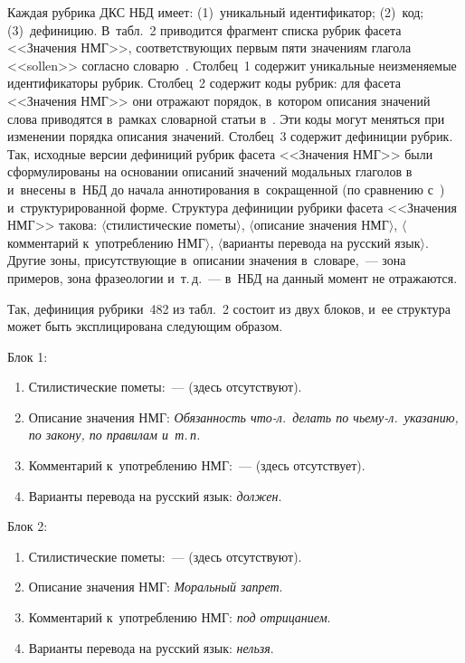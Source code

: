 \begin{multicols}{2}
 
     Каждая рубрика ДКС НБД имеет: (1)~уникальный идентификатор; (2)~код; 
(3)~дефиницию. В~табл.~2 приводится фрагмент списка рубрик фасета 
<<Значения НМГ>>, соответствующих первым пяти значениям глагола 
<<sollen>> согласно словарю~\cite{13-gon}. Столбец~1 содержит уникальные 
неизменяемые идентификаторы рубрик. Столбец~2 содержит коды рубрик: для 
фасета <<Значения НМГ>> они отражают порядок, в~котором описания 
значений слова приводятся в~рамках словарной статьи в~\cite{13-gon}. Эти 
коды могут меняться при изменении порядка описания значений. Столбец~3 
содержит дефиниции рубрик. Так, исходные версии дефиниций рубрик фасета 
<<Значения НМГ>> были сформулированы на основании описаний значений 
модальных глаголов в~\cite{13-gon} и~внесены в~НБД до начала 
аннотирования в~сокращенной (по сравнению  
с~\cite{13-gon}) и~структурированной форме. Структура дефиниции рубрики 
фасета <<Значения НМГ>> такова: $\langle$стилистические пометы$\rangle$, $\langle$описание 
значения НМГ$\rangle$, $\langle$комментарий к~употреблению НМГ$\rangle$, $\langle$варианты перевода 
на русский язык$\rangle$. Другие зоны, присутствующие в~описании значения 
в~словаре,~--- зона примеров, зона фразеологии и~т.\,д.~--- в~НБД на данный 
момент не отражаются.
     

     
     Так, дефиниция рубрики~482 из табл.~2 состоит из двух блоков, и~ее 
структура может быть эксплицирована следующим образом.
     
Блок 1:
\begin{enumerate}[{1.}1]
\item Стилистические пометы:~--- (здесь отсутствуют).
\item Описание значения НМГ: \textit{Обязанность что-л.\ делать по 
чьему-л.\ указанию, по закону, по правилам и~т.\,п.}
\item Комментарий к~употреблению НМГ:~--- (здесь отсутствует).
\item Варианты перевода на русский язык: \textit{должен}.
\end{enumerate}

Блок 2:
\begin{enumerate}[2.1]
\item Стилистические пометы:~--- (здесь отсутствуют).
\item Описание значения НМГ: \textit{Моральный запрет}.
\item Комментарий к~употреблению НМГ: \textit{под отрицанием}.
\item Варианты перевода на русский язык: \textit{нельзя}.
\end{enumerate}


\end{multicols}
